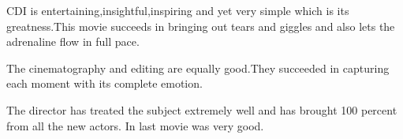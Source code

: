 \documentclass[]{article}
\begin{document}
CDI is entertaining,insightful,inspiring and yet very simple which is its greatness.This movie succeeds in bringing out tears and giggles and also lets the adrenaline flow in full pace.

The cinematography and editing are equally good.They succeeded in capturing each moment with its complete emotion.

The director has treated the subject extremely well and has brought 100 percent from all the new actors.
In last movie was very good.
\end{document}
